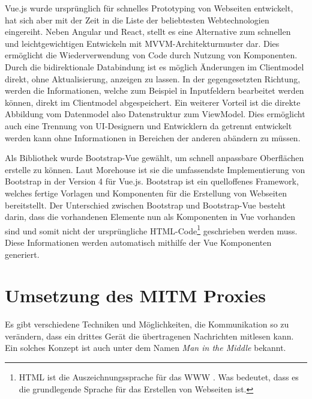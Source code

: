     Vue.js \cite{you2018vue} wurde ursprünglich für schnelles Prototyping von Webseiten entwickelt, hat sich aber mit der Zeit in die Liste der beliebtesten Webtechnologien eingereiht. Neben Angular und React, stellt es eine Alternative zum schnellen und leichtgewichtigen Entwickeln mit \ac{MVVM}-Architekturmuster dar. Dies ermöglicht die Wiederverwendung von Code durch Nutzung von Komponenten. Durch die bidirektionale Databindung ist es möglich Änderungen im Clientmodel direkt, ohne Aktualisierung, anzeigen zu lassen. In der gegengesetzten Richtung, werden die Informationen, welche zum Beispiel in Inputfeldern bearbeitet werden können, direkt im Clientmodel abgespeichert. Ein weiterer Vorteil ist die direkte Abbildung vom Datenmodel also Datenstruktur zum ViewModel. Dies ermöglicht auch eine Trennung von UI-Designern und Entwicklern da getrennt entwickelt werden kann ohne Informationen in Bereichen der anderen abändern zu müssen.
    
    Als Bibliothek wurde Bootstrap-Vue gewählt, um schnell anpassbare Oberflächen erstelle zu können.
    Laut Morehouse \cite{morehouse_2019} ist sie die umfassendste Implementierung von Bootstrap in der Version 4 für Vue.js.
    Bootstrap ist ein quelloffenes Framework, welches fertige Vorlagen und Komponenten für die Erstellung von Webseiten bereitstellt. Der Unterschied zwischen Bootstrap und Bootstrap-Vue besteht darin, dass die vorhandenen Elemente nun als Komponenten in Vue vorhanden sind und somit nicht der ursprüngliche \ac{HTML}-Code\footnote{\ac{HTML} ist die Auszeichnungssprache für das \ac{WWW} \cite{w3c_2017}. Was bedeutet, dass es die grundlegende Sprache für das Erstellen von Webseiten ist.} geschrieben werden muss. Diese Informationen werden automatisch mithilfe der Vue Komponenten generiert.
        
\section{Umsetzung des MITM Proxies}
    Es gibt verschiedene Techniken und Möglichkeiten, die Kommunikation so zu verändern, dass ein drittes Gerät die übertragenen Nachrichten mitlesen kann. Ein solches Konzept ist auch unter dem Namen \emph{Man in the Middle} bekannt.
    

